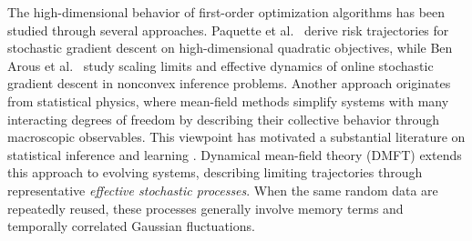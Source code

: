 The high-dimensional behavior of first-order optimization
algorithms has been studied through several approaches.
Paquette et al.~\cite{paquette2022} derive risk trajectories
for stochastic gradient descent on high-dimensional quadratic
objectives, while Ben Arous et
al.~\cite{arous2021online,arous2023highdimensional}
study scaling limits and effective dynamics of online
stochastic gradient descent in nonconvex inference problems.
Another approach originates from statistical physics, where
mean-field methods simplify systems with many interacting
degrees of freedom by describing their collective behavior
through macroscopic observables.
This viewpoint has motivated a substantial literature on
statistical inference and learning
\cite{mezard2009information,zdeborova2016statistical}.
Dynamical mean-field theory (DMFT) extends this approach
to evolving systems, describing limiting trajectories
through representative \emph{effective stochastic processes}.
When the same random data are repeatedly reused, these
processes generally involve memory terms and temporally
correlated Gaussian fluctuations.

